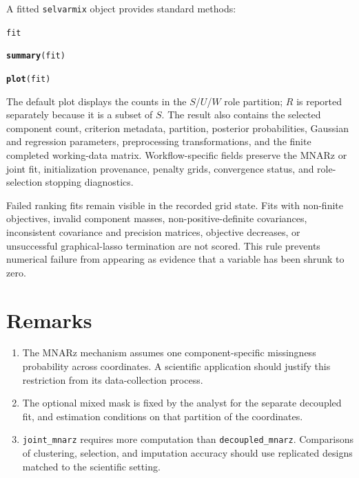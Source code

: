 \documentclass[10pt]{article}\usepackage[]{graphicx}\usepackage[]{xcolor}
\makeatletter
\newcommand{\hldef}[1]{\textcolor[rgb]{0.345,0.345,0.345}{#1}}%
\newcommand{\hlkwd}[1]{\textcolor[rgb]{0.737,0.353,0.396}{\textbf{#1}}}%
\newenvironment{kframe}{%
 \def\at@end@of@kframe{}%
 \ifinner\ifhmode%
  \def\at@end@of@kframe{\end{minipage}}%
  \begin{minipage}{\columnwidth}%
 \fi\fi%
 \def\FrameCommand##1{\hskip\@totalleftmargin \hskip-\fboxsep
 \colorbox{shadecolor}{##1}\hskip-\fboxsep
     \hskip-\linewidth \hskip-\@totalleftmargin \hskip\columnwidth}%
 \MakeFramed {\advance\hsize-\width
   \@totalleftmargin\z@ \linewidth\hsize
   \@setminipage}}%
 {\par\unskip\endMakeFramed%
 \at@end@of@kframe}
\newenvironment{knitrout}{}{} %
\makeatother
\begin{document}
A fitted \texttt{selvarmix} object provides standard methods:

\begin{knitrout}
\color{fgcolor}\begin{kframe}
\begin{alltt}
\hldef{fit}
\end{alltt}


{\ttfamily\noindent\bfseries\color{errorcolor}{\#> Error:\\\#> ! object 'fit' not found}}\begin{alltt}
\hlkwd{summary}\hldef{(fit)}
\end{alltt}


{\ttfamily\noindent\bfseries\color{errorcolor}{\#> Error:\\\#> ! object 'fit' not found}}\begin{alltt}
\hlkwd{plot}\hldef{(fit)}
\end{alltt}


{\ttfamily\noindent\bfseries\color{errorcolor}{\#> Error:\\\#> ! object 'fit' not found}}\end{kframe}
\end{knitrout}

The default plot displays the counts in the $S$/$U$/$W$ role partition; $R$
is reported separately because it is a subset of $S$. The result also
contains the selected component count, criterion metadata, partition,
posterior probabilities, Gaussian and regression parameters, preprocessing
transformations, and the finite completed working-data matrix. Workflow-specific
fields preserve the MNARz or joint fit, initialization provenance, penalty
grids, convergence status, and role-selection stopping diagnostics.

Failed ranking fits remain visible in the recorded grid state. Fits with
non-finite objectives, invalid component masses, non-positive-definite
covariances, inconsistent covariance and precision matrices,
objective decreases, or unsuccessful graphical-lasso termination are not
scored. This rule prevents numerical failure from appearing as evidence that
a variable has been shrunk to zero.

\section{Remarks}

\begin{enumerate}
\item The MNARz mechanism assumes one component-specific missingness
 probability across coordinates. A scientific application should justify
 this restriction from its data-collection process.
\item The optional mixed mask is fixed by the analyst for the separate
 decoupled fit, and estimation conditions on that partition of the
 coordinates.
\item \texttt{joint\_mnarz} requires more computation than
 \texttt{decoupled\_mnarz}. Comparisons of clustering, selection, and
 imputation accuracy should use replicated designs matched to the scientific
 setting.
\end{enumerate}



\end{document}
